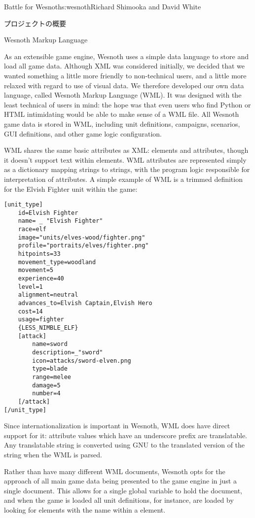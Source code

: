 \begin{aosachapter}{Battle for Wesnoth}{s:wesnoth}{Richard Shimooka and David White}
\begin{aosasect1}{プロジェクトの概要}
\end{aosasect1}

\begin{aosasect1}{Wesnoth Markup Language}

As an extensible game engine, Wesnoth uses a simple data language to
store and load all game data. Although XML was considered initially,
we decided that we wanted something a little more friendly to non-technical
users, and a little more relaxed with regard to use of visual data.
We therefore developed our own data language,
called Wesnoth Markup Language (WML). It was designed with the least
technical of users in mind: the hope was that even users who find
Python or HTML intimidating would be able to make sense of a WML
file. All Wesnoth game data is stored in WML, including unit
definitions, campaigns, scenarios, GUI definitions, and other game
logic configuration.

WML shares the same basic attributes as XML: elements and attributes,
though it doesn't support text within elements. WML attributes are
represented simply as a dictionary mapping strings to strings, with
the program logic responsible for interpretation of attributes. A
simple example of WML is a trimmed definition for the Elvish Fighter
unit within the game:

\begin{verbatim}
[unit_type]
    id=Elvish Fighter
    name= _ "Elvish Fighter"
    race=elf
    image="units/elves-wood/fighter.png"
    profile="portraits/elves/fighter.png"
    hitpoints=33
    movement_type=woodland
    movement=5
    experience=40
    level=1
    alignment=neutral
    advances_to=Elvish Captain,Elvish Hero
    cost=14
    usage=fighter
    {LESS_NIMBLE_ELF}
    [attack]
        name=sword
        description=_"sword"
        icon=attacks/sword-elven.png
        type=blade
        range=melee
        damage=5
        number=4
    [/attack]
[/unit_type]
\end{verbatim}

Since internationalization is important in Wesnoth, WML does have
direct support for it: attribute values which have an underscore
prefix are translatable. Any translatable string is converted using
GNU  to the translated version of the string when the
WML is parsed.

Rather than have many different WML documents, Wesnoth opts for the
approach of all main game data being presented to the game engine in
just a single document. This allows for a single global variable to
hold the document, and when the game is loaded all unit definitions,
for instance, are loaded by looking for elements with the name
 within a  element.


\end{aosasect1}
\end{aosachapter}
